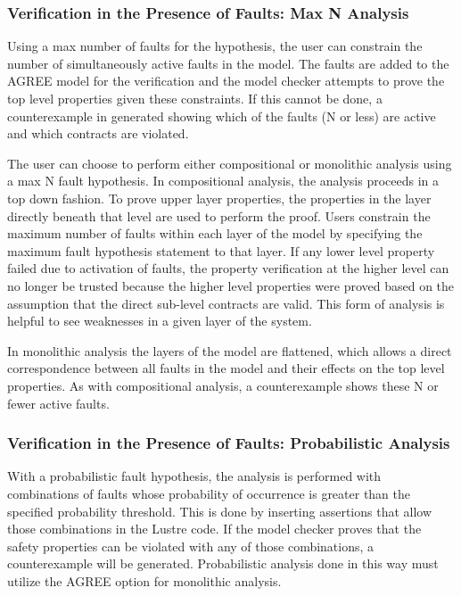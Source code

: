 \subsubsection{Verification in the Presence of Faults: Max N Analysis}
Using a max number of faults for the hypothesis, the user can constrain the number of simultaneously active faults in the model. The faults are added to the AGREE model for the verification and the model checker attempts to prove the top level properties given these constraints. If this cannot be done, a counterexample in generated showing which of the faults (N or less) are active and which contracts are violated. 

The user can choose to perform either compositional or monolithic analysis using a max N fault hypothesis. In compositional analysis, the analysis proceeds in a top down fashion. To prove upper layer %
properties, the properties in the layer directly beneath that %
level are used to perform the proof. %
 Users constrain the maximum number of faults within each layer of the model by specifying the maximum fault hypothesis statement to that layer. If any lower level property failed due to activation of faults, the property verification at the higher level can no longer be trusted because the higher level properties were proved based on the assumption that the direct sub-level contracts are valid. This form of analysis is helpful to see weaknesses in a given layer of the system. 

In monolithic analysis the layers of the model are flattened, which allows a direct correspondence between all faults in the model and their effects on the top level properties. As with compositional analysis, a counterexample shows these N or fewer active faults. 

\subsubsection{Verification in the Presence of Faults: Probabilistic Analysis} 
With a probabilistic fault hypothesis, the analysis is performed with combinations of faults whose probability of occurrence  is greater than the specified probability threshold. This is done by inserting assertions that allow those combinations in the Lustre code. If the model checker proves that the safety properties can be violated with any of those combinations, a counterexample will be generated.  
Probabilistic analysis done in this way must utilize the  AGREE option for monolithic analysis. 


